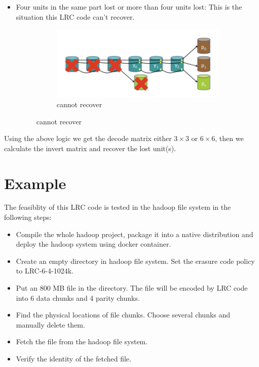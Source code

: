 \documentclass[10pt]{article}
\begin{document}
\begin{itemize}
\begin{itemize}
\item Four units in the same part lost or more than four units lost: This is the situation this LRC code can't recover.
\begin{figure}[H]
\centering
\begin{subfigure}[b]{0.5\textwidth}
        \includegraphics[width=\textwidth]{LRC-5.png}
        \caption{cannot recover}
\end{subfigure}
\end{figure}
\end{itemize}
\end{itemize}

Using the above logic we get the decode matrix either $3 \times 3$ or $6\times 6$, then we calculate the invert matrix and recover the lost unit(s).



\section{Example}
The feasiblity of this LRC code is tested in the hadoop file system in the following steps:
\begin{itemize}
\item Compile the whole hadoop project, package it into a native distribution and deploy the hadoop system using docker container.
\item Create an empty directory in hadoop file system. Set the erasure code policy to LRC-6-4-1024k.
\item Put an 800 MB file in the directory. The file will be encoded by LRC code into 6 data chunks and 4 parity chunks.
\item Find the physical locations of file chunks. Choose several chunks and manually delete them. 
\item Fetch the file from the hadoop file system. 
\item Verify the identity of the fetched file.
\end{itemize}
\end{document}
